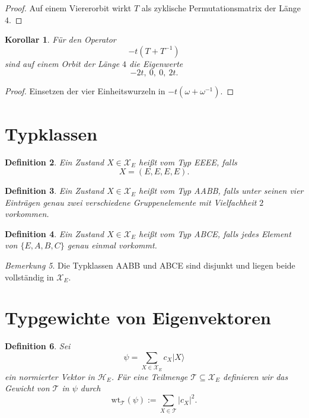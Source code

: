 \documentclass[11pt,a4paper]{article}
\newtheorem{definition}{Definition}[section]
\newtheorem{corollary}[definition]{Korollar}
\theoremstyle{remark}
\newtheorem{remark}[definition]{Bemerkung}
\newcommand{\XE}{\mathcal X_E}
\newcommand{\HE}{\mathcal H_E}
\newcommand{\wt}{\mathrm{wt}}
\begin{document}
	\begin{proof}
		Auf einem Viererorbit wirkt \(T\) als zyklische Permutationsmatrix der Länge \(4\).
	\end{proof}
	
	\begin{corollary}
		Für den Operator
		\[
		-t(T+T^{-1})
		\]
		sind auf einem Orbit der Länge \(4\) die Eigenwerte
		\[
		-2t,\ 0,\ 0,\ 2t.
		\]
	\end{corollary}
	
	\begin{proof}
		Einsetzen der vier Einheitswurzeln in \(-t(\omega+\omega^{-1})\).
	\end{proof}
	
	\section{Typklassen}
	
	\begin{definition}
		Ein Zustand \(X\in\XE\) heißt vom Typ \emph{EEEE}, falls
		\[
		X=(E,E,E,E).
		\]
	\end{definition}
	
	\begin{definition}
		Ein Zustand \(X\in\XE\) heißt vom Typ \emph{AABB}, falls unter seinen vier Einträgen genau zwei verschiedene Gruppenelemente mit Vielfachheit \(2\) vorkommen.
	\end{definition}
	
	\begin{definition}
		Ein Zustand \(X\in\XE\) heißt vom Typ \emph{ABCE}, falls jedes Element von \(\{E,A,B,C\}\) genau einmal vorkommt.
	\end{definition}
	
	\begin{remark}
		Die Typklassen AABB und ABCE sind disjunkt und liegen beide vollständig in \(\XE\).
	\end{remark}
	
	\section{Typgewichte von Eigenvektoren}
	
	\begin{definition}
		Sei
		\[
		\psi=\sum_{X\in\XE} c_X |X\rangle
		\]
		ein normierter Vektor in \(\HE\). Für eine Teilmenge \(\mathcal T\subseteq \XE\) definieren wir das Gewicht von \(\mathcal T\) in \(\psi\) durch
		\[
		\wt_{\mathcal T}(\psi):=\sum_{X\in\mathcal T}|c_X|^2.
		\]
	\end{definition}
	
\end{document}
